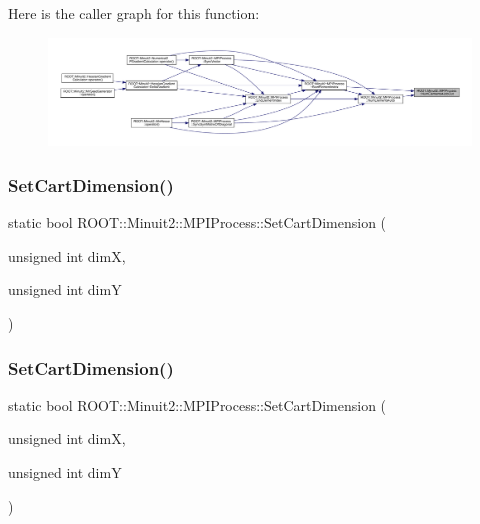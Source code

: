 Here is the caller graph for this function\+:
\nopagebreak
\begin{figure}[H]
\begin{center}
\leavevmode
\includegraphics[width=350pt]{dc/d43/classROOT_1_1Minuit2_1_1MPIProcess_a8ab54fbeb2dd760265e0121573361c3f_icgraph}
\end{center}
\end{figure}
\mbox{\label{classROOT_1_1Minuit2_1_1MPIProcess_a225f9dc66bcc0098c9f9ac0ec7c498b1}} 
\subsubsection{\texorpdfstring{SetCartDimension()}{SetCartDimension()}\hspace{0.1cm}{\footnotesize\ttfamily [1/3]}}
{\footnotesize\ttfamily static bool R\+O\+O\+T\+::\+Minuit2\+::\+M\+P\+I\+Process\+::\+Set\+Cart\+Dimension (\begin{DoxyParamCaption}\item[{unsigned int}]{dimX,  }\item[{unsigned int}]{dimY }\end{DoxyParamCaption})\hspace{0.3cm}{\ttfamily [static]}}

\mbox{\label{classROOT_1_1Minuit2_1_1MPIProcess_a225f9dc66bcc0098c9f9ac0ec7c498b1}} 
\subsubsection{\texorpdfstring{SetCartDimension()}{SetCartDimension()}\hspace{0.1cm}{\footnotesize\ttfamily [2/3]}}
{\footnotesize\ttfamily static bool R\+O\+O\+T\+::\+Minuit2\+::\+M\+P\+I\+Process\+::\+Set\+Cart\+Dimension (\begin{DoxyParamCaption}\item[{unsigned int}]{dimX,  }\item[{unsigned int}]{dimY }\end{DoxyParamCaption})\hspace{0.3cm}{\ttfamily [static]}}

